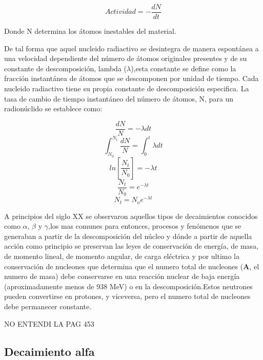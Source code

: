 \documentclass[12pt,fleqn]{book} %
\numberwithin{equation}{section} %
\numberwithin{figure}{section} %
\numberwithin{table}{section} %
\begin{document}
\begin{equation}
 Actividad = -\frac{dN}{dt}
\end{equation}

Donde  N determina los átomos inestables del material.

De tal forma que aquel nucleido radiactivo se desintegra de manera espontánea a una velocidad dependiente del número de átomos originales presentes y de su constante de descomposición, lambda ($\lambda$),esta constante se define como la fracción instantánea de átomos que se descomponen por unidad de tiempo.
Cada nucleido radiactivo tiene su propia constante de descomposición especifica.
La tasa de cambio de tiempo instantáneo del número de átomos, N, para un radionúclido se establece como:

\begin{equation}
\frac{dN}{N}=-\lambda dt
\end{equation}
\begin{equation}
\int_{N_{0}}^{N_{t}}\frac{dN}{N}=\int_{0}^{t}\lambda dt
\end{equation}
\begin{equation}
ln\left [  \frac{N_{t}}{N_{0}}\right ]=-\lambda t
\end{equation}
\begin{equation}
\frac{N_{t}}{N_{0}}=e^{-\lambda t}
\end{equation}
\begin{equation}
N_{t}=N_{o}e^{-\lambda t}
\end{equation}

A principios del siglo XX se observaron aquellos tipos de decaimientos conocidos como $\alpha$, $\beta$ y $\gamma$,los mas comunes para entonces, procesos y fenómenos que se generaban a partir de la descomposición del núcleo y dónde a partir de aquella acción como principio se preservan  las leyes de conservación de energía, de masa, de momento lineal, de momento angular, de carga eléctrica y por ultimo la conservación de nucleones que determina  que el numero total de nucleones (\textbf{A}, el numero de masa) debe conservarse en una reacción nuclear de baja energía (aproximadamente menos de 938 MeV) o en la descomposición.Estos neutrones pueden convertirse en protones, y viceversa, pero el numero total de nucleones debe permanecer constante.

NO ENTENDI LA PAG 453

\subsection{Decaimiento alfa}
\end{document}
